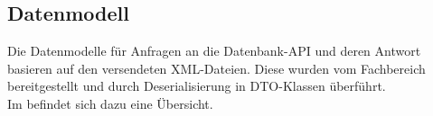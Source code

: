 \subsection{Datenmodell}
\label{sec:Datenmodell}
Die Datenmodelle für Anfragen an die Datenbank-\acs{API} und deren Antwort basieren auf den versendeten \acs{XML}-Dateien. 
Diese wurden vom Fachbereich bereitgestellt und durch Deserialisierung in \acs{DTO}-Klassen überführt.\\
Im  befindet sich dazu eine Übersicht. 

